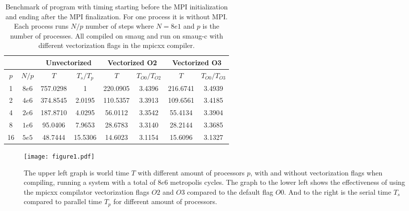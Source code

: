 %

\begin{table}
  \centering
  \begin{tabular}{cc|cc|cc|cc}
    &&\multicolumn{2}{c}{Unvectorized} & \multicolumn{2}{c}{Vectorized O2} &%
    \multicolumn{2}{c}{Vectorized O3}\\\hline
    $p$ & $N/p$ & $T $     & $T_{s}/T_{p}$ & $T$       & $T_{O0}/T_{O2}$ & $T$      & $T_{O0}/T_{O3}$ \\\hline
    1   & $8e6$ & 757.0298 &  1            & 220.0905  & 3.4396          & 216.6741 & 3.4939 \\
    2   & $4e6$ & 374.8545 &  2.0195       & 110.5357  & 3.3913          & 109.6561 & 3.4185 \\  
    4   & $2e6$ & 187.8710 &  4.0295       &  56.0112  & 3.3542          &  55.4134 & 3.3904 \\
    8   & $1e6$ &  95.0406 &  7.9653       &  28.6783  & 3.3140          &  28.2144 & 3.3685 \\
    16  & $5e5$ &  48.7444 & 15.5306       &  14.6023  & 3.1154          &  15.6096 & 3.1327 
  \end{tabular}
  \caption{%
           Benchmark of program with timing starting before the MPI initialization %
           and ending after the MPI finalization. For one process it is without %
           MPI. Each process runs $N/p$ number of steps where $N=8e1$ and $p$ is %
           the number of processes. %
           All compiled on smaug and run on smaug-c with different vectorization %
           flags in the mpicxx compiler. %
         }
  \label{tab:bench}
\end{table}

\begin{figure}[h!]
  \centering
  \texttt{[image: figure1.pdf]}
  \caption{%
           The upper left graph is world time $T$ with different amount of processors $p$, %
           with and without vectorization flags when compiling, running a system with %
           a total of $8e6$ metropolis cycles. The graph to the lower left shows the %
           effectiveness of using the mpicxx compilator vectorization flags $O2$ and %
           $O3$ compared to the default flag $O0$. And to the right is the serial time %
           $T_s$ compared to parallel time $T_p$ for different amount of processors. %
         }
  \label{fig:bench}
\end{figure}
%
